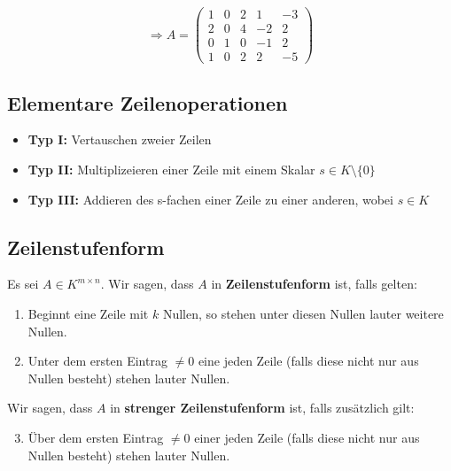 \documentclass{scrartcl}
\begin{document}
\[
\Rightarrow A = 
\left(\begin{array}{cccc|c}
1 & 0 & 2 & 1 & -3 \\
2 & 0 & 4 & -2 & 2\\
0 & 1 & 0 & -1 & 2\\
1 & 0 & 2 & 2 & -5
\end{array}\right)
\]

\subsection{Elementare Zeilenoperationen}
\label{elementare Zeilenoperationen}

\begin{itemize}
\item \textbf{Typ I:} Vertauschen zweier Zeilen
\item \textbf{Typ II:} Multiplizeieren einer Zeile mit einem Skalar $s \in K \setminus \{0\}$
\item \textbf{Typ III:} Addieren des s-fachen einer Zeile zu einer anderen, wobei $s \in K$
\end{itemize}

\subsection{Zeilenstufenform}
\label{Zeilenstufenform}

\begin{Def}
Es sei $A \in K^{m \times n}$. Wir sagen, dass $A$ in \textbf{Zeilenstufenform} ist, falls gelten:
\begin{enumerate}[label={(\alph*)}]
\item Beginnt eine Zeile mit $k$ Nullen, so stehen unter diesen Nullen lauter weitere Nullen.
\item Unter dem ersten Eintrag $\neq 0$ eine jeden Zeile (falls diese nicht nur aus Nullen besteht) stehen lauter Nullen.
\end{enumerate}
Wir sagen, dass $A$  in \textbf{strenger Zeilenstufenform} ist, falls zusätzlich gilt:
\begin{enumerate}[label={(\alph*)}]
\setcounter{enumi}{2}
\item Über dem ersten Eintrag $\neq 0$ einer jeden Zeile (falls diese nicht nur aus Nullen besteht) stehen lauter Nullen.
\end{enumerate}
\end{Def}
\end{document}
